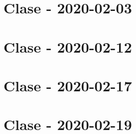 \documentclass{book}
\begin{document}
\chapter{Clase - 2020-02-03}


\chapter{Clase - 2020-02-12}



\chapter{Clase - 2020-02-17}


\chapter{Clase - 2020-02-19}

\end{document}
